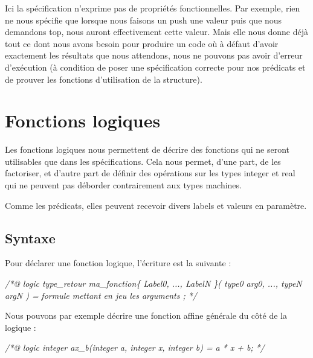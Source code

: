 \documentclass[12pt,francais,]{scrbook}
\newenvironment{Shaded}{}{}
\newcommand{\CommentTok}[1]{\textcolor[rgb]{0.38,0.63,0.69}{\textit{{#1}}}}
\begin{document}
Ici la spécification n'exprime pas de propriétés fonctionnelles. Par
exemple, rien ne nous spécifie que lorsque nous faisons un push une
valeur puis que nous demandons top, nous auront effectivement cette
valeur. Mais elle nous donne déjà tout ce dont nous avons besoin pour
produire un code où à défaut d'avoir exactement les résultats que nous
attendons, nous ne pouvons pas avoir d'erreur d'exécution (à condition
de poser une spécification correcte pour nos prédicats et de prouver les
fonctions d'utilisation de la structure).

\section{Fonctions logiques}\label{fonctions-logiques}

Les fonctions logiques nous permettent de décrire des fonctions qui ne
seront utilisables que dans les spécifications. Cela nous permet, d'une
part, de les factoriser, et d'autre part de définir des opérations sur
les types integer et real qui ne peuvent pas déborder contrairement aux
types machines.

Comme les prédicats, elles peuvent recevoir divers labels et valeurs en
paramètre.

\subsection{Syntaxe}\label{syntaxe-1}

Pour déclarer une fonction logique, l'écriture est la suivante :

\begin{footnotesize}\begin{Shaded}
\begin{Highlighting}[]
\CommentTok{/*@}
\CommentTok{  logic type_retour ma_fonction\{ Label0, ..., LabelN \}( type0 arg0, ..., typeN argN ) =}
\CommentTok{    formule mettant en jeu les arguments ;}
\CommentTok{*/}
\end{Highlighting}
\end{Shaded}\end{footnotesize}

Nous pouvons par exemple décrire une fonction affine générale du côté de
la logique :

\begin{footnotesize}\begin{Shaded}
\begin{Highlighting}[]
\CommentTok{/*@}
\CommentTok{  logic integer ax_b(integer a, integer x, integer b) =}
\CommentTok{    a * x + b;}
\CommentTok{*/}
\end{Highlighting}
\end{Shaded}\end{footnotesize}
\end{document}
